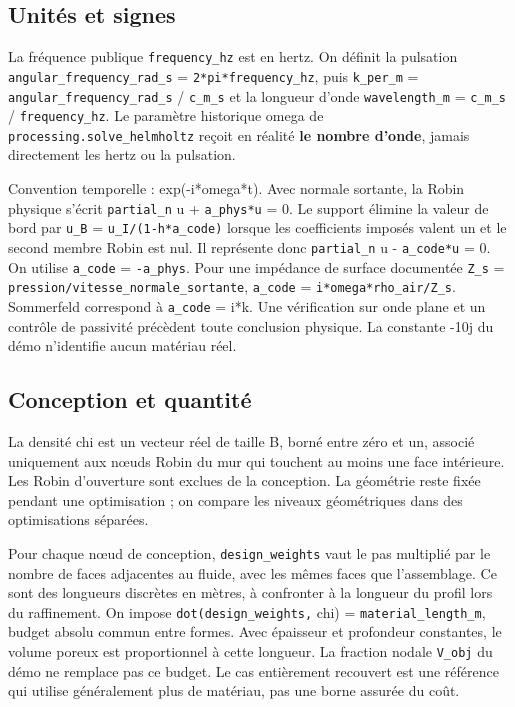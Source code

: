 \documentclass[11pt,a4paper]{article}
\begin{document}
\subsection{Unités et signes}

La fréquence publique {\small\ttfamily \nolinkurl{frequency_hz}} est en hertz. On définit la pulsation {\small\ttfamily \nolinkurl{angular_frequency_rad_s} = \nolinkurl{2*pi*frequency_hz}}, puis {\small\ttfamily \nolinkurl{k_per_m} = \nolinkurl{angular_frequency_rad_s} / \nolinkurl{c_m_s}} et la longueur d'onde {\small\ttfamily \nolinkurl{wavelength_m} = \nolinkurl{c_m_s} / \nolinkurl{frequency_hz}}. Le paramètre historique {\small\ttfamily omega} de {\small\ttfamily \nolinkurl{processing.solve_helmholtz}} reçoit en réalité \textbf{le nombre d'onde}, jamais directement les hertz ou la pulsation.

Convention temporelle : exp(-i*omega*t). Avec normale sortante, la Robin physique s'écrit {\small\ttfamily \nolinkurl{partial_n} u + \nolinkurl{a_phys*u} = 0}. Le support élimine la valeur de bord par {\small\ttfamily \nolinkurl{u_B} = \nolinkurl{u_I/(1-h*a_code)}} lorsque les coefficients imposés valent un et le second membre Robin est nul. Il représente donc {\small\ttfamily \nolinkurl{partial_n} u - \nolinkurl{a_code*u} = 0}. On utilise {\small\ttfamily \nolinkurl{a_code} = \nolinkurl{-a_phys}}. Pour une impédance de surface documentée {\small\ttfamily \nolinkurl{Z_s} = \nolinkurl{pression/vitesse_normale_sortante}}, {\small\ttfamily \nolinkurl{a_code} = \nolinkurl{i*omega*rho_air/Z_s}}. Sommerfeld correspond à {\small\ttfamily \nolinkurl{a_code} = i*k}. Une vérification sur onde plane et un contrôle de passivité précèdent toute conclusion physique. La constante {\small{}-10j} du démo n'identifie aucun matériau réel.

\subsection{Conception et quantité}

La densité {\small\ttfamily chi} est un vecteur réel de taille B, borné entre zéro et un, associé uniquement aux nœuds Robin du mur qui touchent au moins une face intérieure. Les Robin d'ouverture sont exclues de la conception. La géométrie reste fixée pendant une optimisation ; on compare les niveaux géométriques dans des optimisations séparées.

Pour chaque nœud de conception, {\small\ttfamily \nolinkurl{design_weights}} vaut le pas multiplié par le nombre de faces adjacentes au fluide, avec les mêmes faces que l'assemblage. Ce sont des longueurs discrètes en mètres, à confronter à la longueur du profil lors du raffinement. On impose {\small\ttfamily \nolinkurl{dot(design_weights,} chi) = \nolinkurl{material_length_m}}, budget absolu commun entre formes. Avec épaisseur et profondeur constantes, le volume poreux est proportionnel à cette longueur. La fraction nodale {\small\ttfamily \nolinkurl{V_obj}} du démo ne remplace pas ce budget. Le cas entièrement recouvert est une référence qui utilise généralement plus de matériau, pas une borne assurée du coût.
\end{document}
